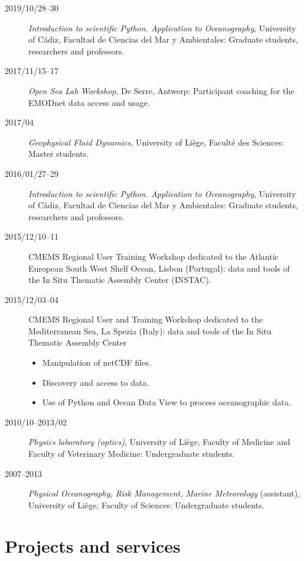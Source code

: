 \documentclass[11pt,a4paper,svgnames]{article}
\begin{document}
\begin{description}

\item[2019/10/28--30] \textit{Introduction to scientific Python. Application to Oceanography}, University of C\'{a}diz, Facultad de Ciencias del Mar y Ambientales: Graduate students, researchers and professors.

\item[2017/11/15--17] \textit{Open Sea Lab Workshop}, De Serre, Antwerp: Participant coaching for the EMODnet data access and usage.

\item[2017/04] \textit{Geophysical Fluid Dynamics}, University of Li\`{e}ge, Facult\'{e} des Sciences: Master students.

\item[2016/01/27--29] \textit{Introduction to scientific Python. Application to Oceanography}, University of C\'{a}diz, Facultad de Ciencias del Mar y Ambientales: Graduate students, researchers and professors.

\item[2015/12/10--11] CMEMS Regional User Training Workshop dedicated to the Atlantic European South West Shelf Ocean, Lisbon (Portugal): data and tools of the In Situ Thematic Assembly Center (INSTAC). 
\item[2015/12/03--04] CMEMS Regional User and Training Workshop dedicated to the Mediterranean Sea, La Spezia (Italy): data and tools of the In Situ Thematic Assembly Center
\begin{itemize}
\item Manipulation of netCDF files.
\item Discovery and access to data.
\item Use of Python and Ocean Data View to process oceanographic data.
\end{itemize}
\item[2010/10--2013/02] \textit{Physics laboratory (optics)}, University of Li\`{e}ge, Faculty of Medicine and Faculty of Veterinary Medicine: Undergraduate students.
\item[2007--2013] \textit{Physical Oceanography, Risk Management, Marine Meteorology} (assistant), University of Li\`{e}ge, Faculty of Sciences: Undergraduate students.

\end{description}


\section{Projects and services}
\end{document}
